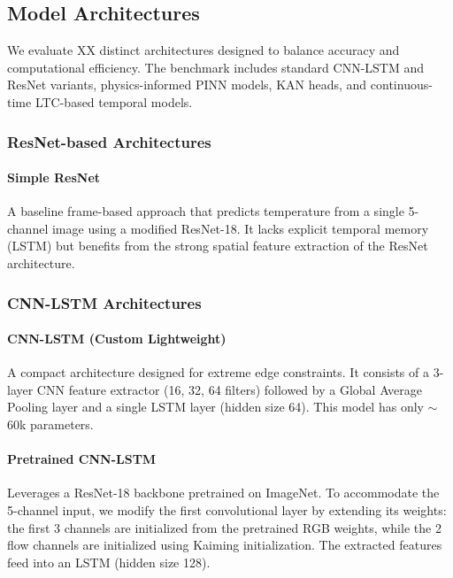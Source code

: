 
\subsection{Model Architectures}
We evaluate XX distinct architectures designed to balance accuracy and computational efficiency.
The benchmark includes standard CNN-LSTM and ResNet variants, physics-informed PINN models, KAN heads, and continuous-time LTC-based temporal models.

\subsubsection{ResNet-based Architectures}

\paragraph{Simple ResNet}
A baseline frame-based approach that predicts temperature from a single 5-channel image using a modified ResNet-18. It lacks explicit temporal memory (LSTM) but benefits from the strong spatial feature extraction of the ResNet architecture.

\subsubsection{CNN-LSTM Architectures}

\paragraph{CNN-LSTM (Custom Lightweight)}

A compact architecture designed for extreme edge constraints. 
It consists of a 3-layer CNN feature extractor (16, 32, 64 filters) followed by a Global Average Pooling layer and a single LSTM layer (hidden size 64). 
This model has only $\sim$60k parameters.

\paragraph{Pretrained CNN-LSTM}

Leverages a ResNet-18 \cite{he2016deep} backbone pretrained on ImageNet. 
To accommodate the 5-channel input, we modify the first convolutional layer by extending its weights: the first 3 channels are initialized from the pretrained RGB weights, while the 2 flow channels are initialized using Kaiming initialization. 
The extracted features feed into an LSTM (hidden size 128).


